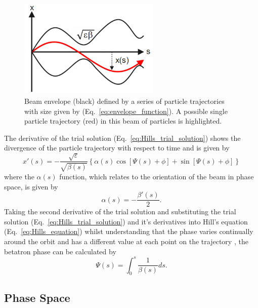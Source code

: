 \documentclass[../main.tex]{subfiles}
\begin{document}
\begin{figure}[!h]
\centering
\includegraphics[width=0.6\textwidth]{Figures/Energy_Recovery_Linac_Design/Beam_Envelope_fixed.pdf}
\caption{Beam envelope (black) defined by a series of particle trajectories with size given by (Eq.~\ref{eq:envelope_function}). A possible single particle trajectory (red) in this beam of particles is highlighted.}
\label{fig:beam_envelope}
\end{figure}

The derivative of the trial solution (Eq.~\ref{eq:Hills_trial_solution}) shows the divergence of the particle trajectory with respect to time and is given by
\begin{equation}
x'\left(s\right) = -\frac{\sqrt{\varepsilon}}{\sqrt{\beta\left(s\right)}}\left\{\alpha\left(s\right)\cos\left[\Psi\left(s\right)+\phi\right]+\sin\left[\Psi\left(s\right)+\phi\right]\right\}
\label{eq:Hills_trial_solution_derivative}    
\end{equation}
where the $\alpha\left(s\right)$ function, which relates to the orientation of the beam in phase space, is given by
\begin{equation}
\alpha\left(s\right) = -\frac{\beta'\left(s\right)}{2}.
\label{eq:alpha_function}    
\end{equation}
Taking the second derivative of the trial solution and substituting the trial solution (Eq.~\ref{eq:Hills_trial_solution}) and it's derivatives into Hill's equation (Eq.~\ref{eq:Hills_equation}) whilst understanding that the phase varies continually around the orbit and has a different value at each point on the trajectory \cite{wille2000physics}, the betatron phase can be calculated by
\begin{equation}
\Psi\left(s\right) = \int_{0}^{s}\frac{1}{\beta\left(s\right)}ds.
\label{eq:betatron_phase}    
\end{equation}

\subsection{Phase Space}
\end{document}
